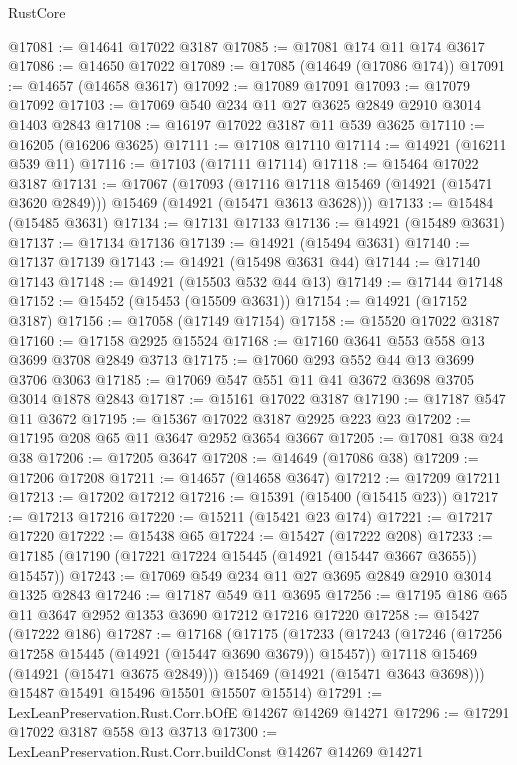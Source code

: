 \begin{lexlean}{RustCore}
\begin{coremodule}
@17081 := @14641 @17022 @3187
@17085 := @17081 @174 @11 @174 @3617
@17086 := @14650 @17022
@17089 := @17085 (@14649 (@17086 @174))
@17091 := @14657 (@14658 @3617)
@17092 := @17089 @17091
@17093 := @17079 @17092
@17103 := @17069 @540 @234 @11 @27 @3625 @2849 @2910 @3014 @1403 @2843
@17108 := @16197 @17022 @3187 @11 @539 @3625
@17110 := @16205 (@16206 @3625)
@17111 := @17108 @17110
@17114 := @14921 (@16211 @539 @11)
@17116 := @17103 (@17111 @17114)
@17118 := @15464 @17022 @3187
@17131 := @17067
    (@17093
      (@17116 @17118 @15469 (@14921 (@15471 @3620 @2849)))
      @15469
      (@14921 (@15471 @3613 @3628)))
@17133 := @15484 (@15485 @3631)
@17134 := @17131 @17133
@17136 := @14921 (@15489 @3631)
@17137 := @17134 @17136
@17139 := @14921 (@15494 @3631)
@17140 := @17137 @17139
@17143 := @14921 (@15498 @3631 @44)
@17144 := @17140 @17143
@17148 := @14921 (@15503 @532 @44 @13)
@17149 := @17144 @17148
@17152 := @15452 (@15453 (@15509 @3631))
@17154 := @14921 (@17152 @3187)
@17156 := @17058 (@17149 @17154)
@17158 := @15520 @17022 @3187
@17160 := @17158 @2925 @15524
@17168 := @17160 @3641 @553 @558 @13 @3699 @3708 @2849 @3713
@17175 := @17060 @293 @552 @44 @13 @3699 @3706 @3063
@17185 := @17069 @547 @551 @11 @41 @3672 @3698 @3705 @3014 @1878 @2843
@17187 := @15161 @17022 @3187
@17190 := @17187 @547 @11 @3672
@17195 := @15367 @17022 @3187 @2925 @223 @23
@17202 := @17195 @208 @65 @11 @3647 @2952 @3654 @3667
@17205 := @17081 @38 @24 @38
@17206 := @17205 @3647
@17208 := @14649 (@17086 @38)
@17209 := @17206 @17208
@17211 := @14657 (@14658 @3647)
@17212 := @17209 @17211
@17213 := @17202 @17212
@17216 := @15391 (@15400 (@15415 @23))
@17217 := @17213 @17216
@17220 := @15211 (@15421 @23 @174)
@17221 := @17217 @17220
@17222 := @15438 @65
@17224 := @15427 (@17222 @208)
@17233 := @17185 (@17190 (@17221 @17224 @15445 (@14921 (@15447 @3667 @3655)) @15457))
@17243 := @17069 @549 @234 @11 @27 @3695 @2849 @2910 @3014 @1325 @2843
@17246 := @17187 @549 @11 @3695
@17256 := @17195 @186 @65 @11 @3647 @2952 @1353 @3690 @17212 @17216 @17220
@17258 := @15427 (@17222 @186)
@17287 := @17168
    (@17175
      (@17233
        (@17243
          (@17246 (@17256 @17258 @15445 (@14921 (@15447 @3690 @3679)) @15457))
          @17118
          @15469
          (@14921 (@15471 @3675 @2849)))
        @15469
        (@14921 (@15471 @3643 @3698)))
      @15487
      @15491
      @15496
      @15501
      @15507
      @15514)
@17291 := LexLeanPreservation.Rust.Corr.bOfE @14267 @14269 @14271
@17296 := @17291 @17022 @3187 @558 @13 @3713
@17300 := LexLeanPreservation.Rust.Corr.buildConst @14267 @14269 @14271

\end{coremodule}
\end{lexlean}
